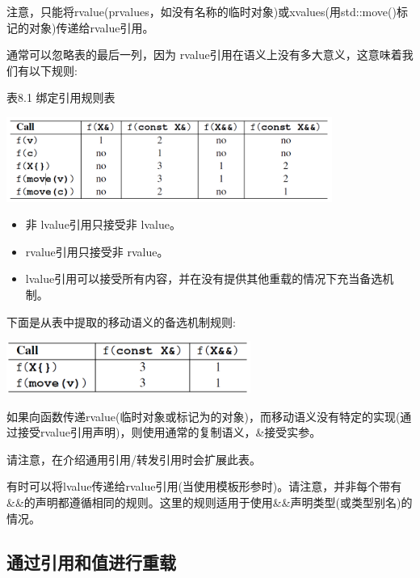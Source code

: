 注意，只能将rvalue(prvalues，如没有名称的临时对象)或xvalues(用std::move()标记的对象)传递给rvalue引用。

通常可以忽略表的最后一列，因为 rvalue引用在语义上没有多大意义，这意味着我们有以下规则:

\hspace*{\fill}  %
表8.1 绑定引用规则表

\begin{center}
	\includegraphics[width=0.8\textwidth]{part1/ch8/images/3}
\end{center}

\begin{itemize}
	\item 非 lvalue引用只接受非 lvalue。
	\item rvalue引用只接受非 rvalue。
	\item {} lvalue引用可以接受所有内容，并在没有提供其他重载的情况下充当备选机制。
\end{itemize}

下面是从表中提取的移动语义的备选机制规则:

\begin{center}
	\includegraphics[width=0.6\textwidth]{part1/ch8/images/4}
\end{center}

如果向函数传递rvalue(临时对象或标记为的对象)，而移动语义没有特定的实现(通过接受rvalue引用声明)，则使用通常的复制语义，\&接受实参。

请注意，在介绍通用引用/转发引用时会扩展此表。

有时可以将lvalue传递给rvalue引用(当使用模板形参时)。请注意，并非每个带有\&\&的声明都遵循相同的规则。这里的规则适用于使用\&\&声明类型(或类型别名)的情况。

\subsection{通过引用和值进行重载}

